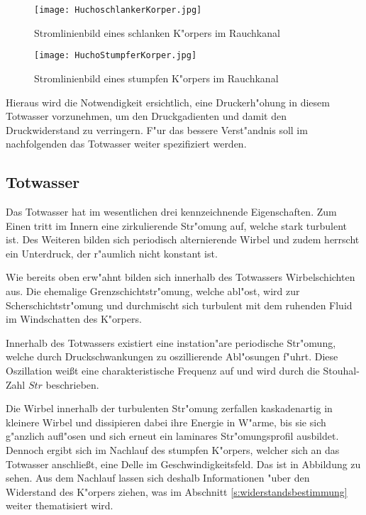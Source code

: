 \begin{figure}[h]
	\centering
	\texttt{[image: HuchoschlankerKorper.jpg]}
	\caption{Stromlinienbild eines schlanken K"orpers im Rauchkanal \cite{Hucho.2011}}
	\label{fig:HuchoSchlank}
\end{figure}

\begin{figure}[h]
	\centering
	\texttt{[image: HuchoStumpferKorper.jpg]}
	\caption{Stromlinienbild eines stumpfen K"orpers im Rauchkanal \cite{Hucho.2011}}
	\label{fig:HuchoStumpf}
\end{figure}

Hieraus wird die Notwendigkeit ersichtlich, eine Druckerh"ohung in diesem Totwasser vorzunehmen, um den Druckgadienten und damit den Druckwiderstand zu verringern. F"ur das bessere Verst"andnis soll im nachfolgenden das Totwasser weiter spezifiziert werden.

\subsection{Totwasser}
\label{sec:Totwasser}
Das Totwasser hat im wesentlichen drei kennzeichnende Eigenschaften. Zum Einen tritt im Innern eine zirkulierende Str"omung auf, welche stark turbulent ist. Des Weiteren bilden sich periodisch alternierende Wirbel und zudem herrscht ein Unterdruck, der r"aumlich nicht konstant ist.

Wie bereits oben erw"ahnt bilden sich innerhalb des Totwassers Wirbelschichten aus. Die ehemalige Grenzschichtstr"omung, welche abl"ost, wird zur Scherschichtstr"omung und durchmischt sich turbulent mit dem ruhenden Fluid im Windschatten des K"orpers.



 
Innerhalb des Totwassers existiert eine instation"are periodische Str"omung, welche durch Druckschwankungen zu oszillierende Abl"osungen f"uhrt. Diese Oszillation wei\ss{}t eine charakteristische Frequenz auf und wird durch die Stouhal-Zahl ${Str}$ beschrieben. 

Die Wirbel innerhalb der turbulenten Str"omung  zerfallen kaskadenartig in kleinere Wirbel und dissipieren dabei ihre Energie in W"arme, bis sie sich g"anzlich aufl"osen und sich erneut ein laminares Str"omungsprofil ausbildet. Dennoch ergibt sich im Nachlauf des stumpfen K"orpers, welcher sich an das Totwasser anschlie\ss{}t, eine Delle im Geschwindigkeitsfeld. Das ist in Abbildung  zu sehen. Aus dem Nachlauf lassen sich deshalb Informationen "uber den Widerstand des K"orpers ziehen, was im Abschnitt \ref{s:widerstandsbestimmung} weiter thematisiert wird. 

